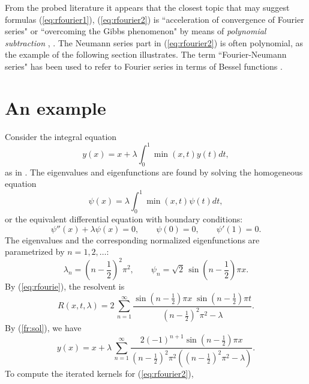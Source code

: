 \documentclass{article}
\begin{document}
From the probed literature it appears that the closest topic that may suggest formulas (\ref{eq:rfourier1}), (\ref{eq:rfourier2})
is ``acceleration of convergence of Fourier series" or ``overcoming the Gibbs phenomenon" by means of {\em polynomial subtraction}
\cite[\S 5.1]{Adcock}, \cite{Nersesian}. The Neumann series part in (\ref{eq:rfourier2}) is often polynomial,
as the example of the following section illustrates.
The term ``Fourier-Neumann series" has been used to refer to %
Fourier series  in terms of Bessel functions \cite{Ciauri}.

\section{An example}

Consider the integral equation 
\begin{equation} \label{eq:inteq}
y(x)=x+\lambda\int_0^1 \min(x,t) y(t)dt,
\end{equation}
as in \cite[p.~124--127]{Kleiza}. 
The eigenvalues and eigenfunctions are found by solving the homogeneous equation
\begin{equation}
\psi(x)=\lambda\int_0^1 \min(x,t) \psi(t)dt,
\end{equation}
or the equivalent differential equation with boundary conditions:
\begin{equation} \label{eq:boundcond}
\psi''(x)+\lambda\psi(x)=0, \qquad \psi(0)=0, \qquad \psi'(1)=0.
\end{equation}
The  eigenvalues and the corresponding normalized eigenfunctions are parametrized by $n=1,2,\ldots$:
\begin{equation}
\lambda_n=\left(n-{\textstyle\frac12}\right)^2\pi^2,  \qquad
\psi_n=\sqrt2\,\sin \!\left(n-{\textstyle\frac12}\right)\!\pi x.
\end{equation}
By (\ref{eq:rfourie}), the resolvent is
\begin{equation} 
R(x,t,\lambda)= %
2 \, \sum_{n=1}^{\infty} \frac{\sin\!\left(n-\frac12\right)\!\pi x\;\sin\!\left(n-\frac12\right)\!\pi t}
{\left(n-\frac12\right)^2\pi^2-\lambda}.
\end{equation}
By (\ref{fr:sol}), we have
\begin{equation} \label{eq:approx1}
y(x)=x+
\lambda\,\sum_{n=1}^{\infty} \frac{2(-1)^{n+1}\sin\!\left(n-\frac12\right)\!\pi x}
{\left(n-\frac12\right)^2\!\pi^2\left(\!\left(n-\frac12\right)^2\!\pi^2-\lambda\right)}.
\end{equation}
To compute the iterated kernels for (\ref{eq:rfourier2}), 
\end{document}
